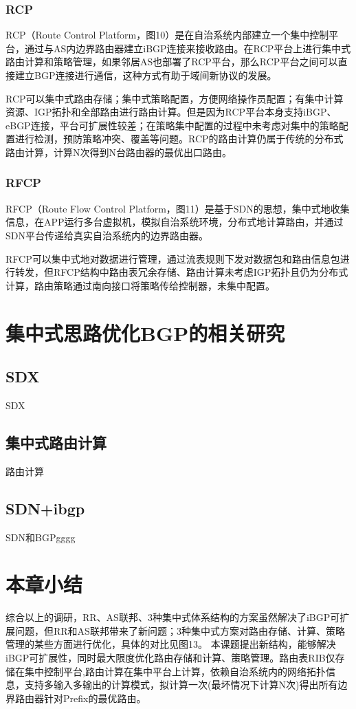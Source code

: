 \subsubsection{RCP}
RCP（Route Control Platform，图10）是在自治系统内部建立一个集中控制平台，通过与AS内边界路由器建立iBGP连接来接收路由。在RCP平台上进行集中式路由计算和策略管理，如果邻居AS也部署了RCP平台，那么RCP平台之间可以直接建立BGP连接进行通信，这种方式有助于域间新协议的发展。

RCP可以集中式路由存储；集中式策略配置，方便网络操作员配置；有集中计算资源、IGP拓扑和全部路由进行路由计算。但是因为RCP平台本身支持iBGP、eBGP连接，平台可扩展性较差；在策略集中配置的过程中未考虑对集中的策略配置进行检测，预防策略冲突、覆盖等问题。RCP的路由计算仍属于传统的分布式路由计算，计算N次得到N台路由器的最优出口路由。

\subsubsection{RFCP}
RFCP（Route Flow Control Platform，图11）是基于SDN的思想，集中式地收集信息，在APP运行多台虚拟机，模拟自治系统环境，分布式地计算路由，并通过SDN平台传递给真实自治系统内的边界路由器。

RFCP可以集中式地对数据进行管理，通过流表规则下发对数据包和路由信息包进行转发，但RFCP结构中路由表冗余存储、路由计算未考虑IGP拓扑且仍为分布式计算，路由策略通过南向接口将策略传给控制器，未集中配置。

\section{集中式思路优化BGP的相关研究}

\subsection{SDX}
SDX

\subsection{集中式路由计算}
路由计算

\subsection{SDN+ibgp}

SDN和BGPgggg\cite{conf/cfi/2014}


\section{本章小结}

综合以上的调研，RR、AS联邦、3种集中式体系结构的方案虽然解决了iBGP可扩展问题，但RR和AS联邦带来了新问题；3种集中式方案对路由存储、计算、策略管理的某些方面进行优化，具体的对比见图13。
本课题提出新结构，能够解决iBGP可扩展性，同时最大限度优化路由存储和计算、策略管理。路由表RIB仅存储在集中控制平台,路由计算在集中平台上计算，依赖自治系统内的网络拓扑信息，支持多输入多输出的计算模式，拟计算一次(最坏情况下计算N次)得出所有边界路由器针对Prefix的最优路由。
